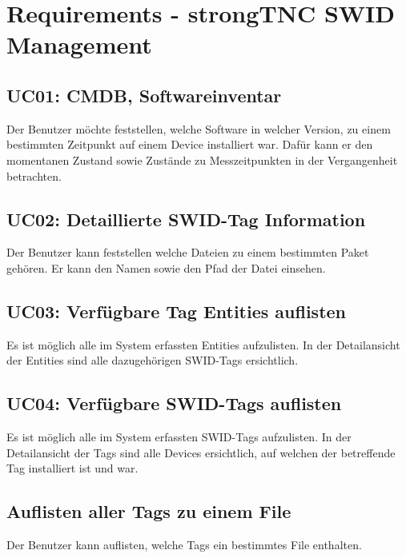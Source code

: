 \section{Requirements - strongTNC SWID Management}

\subsection{UC01: CMDB, Softwareinventar}

Der Benutzer möchte feststellen, welche Software in welcher Version, zu einem
bestimmten Zeitpunkt auf einem Device installiert war. Dafür kann er den
momentanen Zustand sowie Zustände zu Messzeitpunkten in der Vergangenheit
betrachten.

\subsection{UC02: Detaillierte SWID-Tag Information}

Der Benutzer kann feststellen welche Dateien zu einem bestimmten Paket gehören.
Er kann den Namen sowie den Pfad der Datei einsehen.

\subsection{UC03: Verfügbare Tag Entities auflisten}

Es ist möglich alle im System erfassten Entities aufzulisten. In der
Detailansicht der Entities sind alle dazugehörigen SWID-Tags ersichtlich.

\subsection{UC04: Verfügbare SWID-Tags auflisten}

Es ist möglich alle im System erfassten SWID-Tags aufzulisten. In der
Detailansicht der Tags sind alle Devices ersichtlich, auf welchen der
betreffende Tag installiert ist und war.

\subsection{Auflisten aller Tags zu einem File}

Der Benutzer kann auflisten, welche Tags ein bestimmtes File enthalten.
